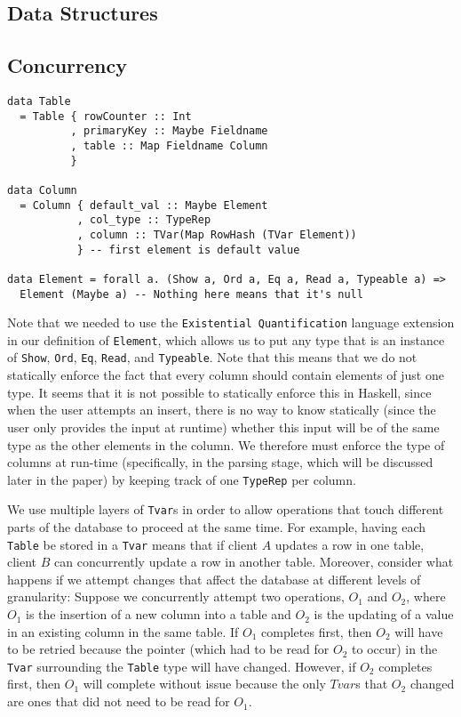 \documentclass[10pt]{article}
\begin{document}
\begin{multicols}{2}
\section{Data Structures}

\subsection{Concurrency} 
\noindent\begin{minipage}{.45\textwidth}
\begin{lstlisting}[caption=The data structures used to build up a table.,frame=tlrb, breaklines=true]
data Table 
  = Table { rowCounter :: Int 
          , primaryKey :: Maybe Fieldname 
          , table :: Map Fieldname Column
		  }

data Column 
  = Column { default_val :: Maybe Element
           , col_type :: TypeRep
           , column :: TVar(Map RowHash (TVar Element))
           } -- first element is default value

data Element = forall a. (Show a, Ord a, Eq a, Read a, Typeable a) => 
  Element (Maybe a) -- Nothing here means that it's null
\end{lstlisting}
\end{minipage}\hfill

Note that we needed to use the \texttt{Existential Quantification} language extension in our definition of \texttt{Element}, which allows us to put any type that is an instance of \texttt{Show}, \texttt{Ord}, \texttt{Eq}, \texttt{Read}, and \texttt{Typeable}.  Note that this means that we do not statically enforce the fact that every column should contain elements of just one type. It seems that it is not possible to statically enforce this in Haskell, since when the user attempts an insert, there is no way to know statically (since the user only provides the input at runtime) whether this input will be of the same type as the other elements in the column. We therefore must enforce the type of columns at run-time (specifically, in the parsing stage, which will be discussed later in the paper) by keeping track of one \texttt{TypeRep} per column. 

We use multiple layers of \texttt{Tvar}s in order to allow operations that touch different parts of the database to proceed at the same time. For example, having each \texttt{Table} be stored in a \texttt{Tvar} means that if client $A$ updates a row in one table, client $B$ can concurrently update a row in another table. Moreover, consider what happens if we attempt changes that affect the database at different levels of granularity: Suppose we concurrently attempt two operations, $O_1$ and $O_2$, where $O_1$ is the insertion of a new column into a table and $O_2$ is the updating of a value in an existing column in the same table. If $O_1$ completes first, then $O_2$ will have to be retried because the pointer (which had to be read for $O_2$ to occur) in the \texttt{Tvar} surrounding the \texttt{Table} type will have changed. However, if $O_2$ completes first, then $O_1$ will complete without issue because the only $Tvar$s that $O_2$ changed are ones that did not need to be read for $O_1$. 



\end{multicols}
\end{document}
